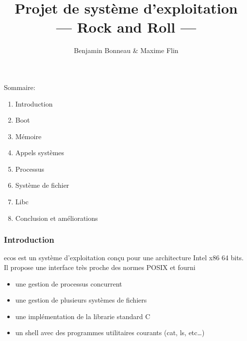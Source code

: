 \documentclass[10pt,a4paper]{beamer}
\author{Benjamin Bonneau \& Maxime Flin }
\title{Projet de système d'exploitation \\ --- Rock and Roll ---}
\begin{document}
\maketitle

\begin{frame}
  Sommaire:
  \begin{enumerate}
  \item Introduction
  \item Boot
  \item Mémoire
  \item Appels systèmes
  \item Processus
  \item Système de fichier
  \item Libc
  \item Conclusion et améliorations
  \end{enumerate}
\end{frame}

\begin{frame}
  \frametitle{Introduction}
  \textrm{ecos} est un système d'exploitation conçu pour une architecture Intel \textrm{x86} 64 bits. Il propose une interface très proche des normes \textrm{POSIX} et fourni
  \begin{itemize}
  \item une gestion de processus concurrent
  \item une gestion de plusieurs systèmes de fichiers
  \item une implémentation de la librarie standard C
  \item un shell avec des programmes utilitaires courants (\textrm{cat}, \textrm{ls}, etc\ldots)
  \end{itemize}
\end{frame}
\end{document}

